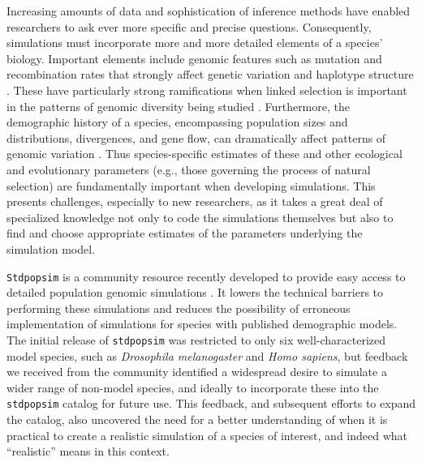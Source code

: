 \documentclass[hidelinks]{article}
\newcommand{\Stdpopsim}{\texttt{Stdpopsim}\xspace}
\newcommand{\stdpopsim}{\texttt{stdpopsim}\xspace}
\begin{document}
Increasing amounts of data and sophistication of inference methods
have enabled researchers to ask ever more
specific and precise questions. Consequently, simulations must incorporate
more and more detailed elements of a species' biology.
Important elements include genomic features such as mutation and recombination
rates that strongly affect genetic variation and haplotype structure
\citep{Nachman2002}. These have particularly strong ramifications 
when linked selection is important in the patterns of genomic diversity being studied \citep{Cutter2013}.
Furthermore, the demographic history of a species,
encompassing population sizes and distributions, divergences, and gene flow, can
dramatically affect patterns of genomic variation \citep{Teshima2006}. Thus
species-specific estimates of these and other ecological and evolutionary parameters 
(e.g., those governing the process of natural selection) 
are fundamentally important when developing simulations.
This presents challenges, especially to new researchers,
as it takes a great deal of specialized knowledge not only to code the simulations themselves
but also to find and choose appropriate estimates of the parameters underlying the simulation model.

\Stdpopsim is a community resource recently developed to provide easy
access to detailed population genomic simulations \citep{Adrion2020}. It
lowers the technical barriers to performing these simulations
and reduces the possibility of erroneous implementation of simulations
for species with published demographic models. 
The initial release of \stdpopsim was
restricted to only six well-characterized model species, such as
\emph{Drosophila melanogaster} and \emph{Homo sapiens},
but feedback we received from the community identified a widespread desire
to simulate a wider range of non-model species,
and ideally to incorporate these into the \stdpopsim catalog for future use.
This feedback, and subsequent efforts to expand the catalog, 
also uncovered the need for a better understanding of when it is practical to create a realistic
simulation of a species of interest, and indeed what ``realistic'' means in this context.
\end{document}
